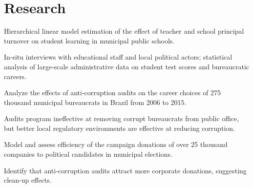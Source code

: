 \documentclass[]{deedy-resume-openfont}
\begin{document}
\begin{minipage}[t]{0.7\textwidth}

\section{Research}
\begin{tightemize}
    \item Hierarchical linear model estimation of the effect of teacher and school principal turnover on student learning in municipal public schools.
    \item In-situ interviews with educational staff and local political actors; statistical analysis of large-scale administrative data on student test scores and bureaucratic careers. 
\end{tightemize}
\sectionsep

\begin{tightemize}
    \item Analyze the effects of anti-corruption audits on the career choices of 275 thousand municipal bureaucrats in Brazil from 2006 to 2015.
    \item Audits program ineffective at removing corrupt bureaucrats from public office, but better local regulatory environments are effective at reducing corruption.
\end{tightemize}
\sectionsep

\begin{tightemize}
    \item Model and assess efficiency of the campaign donations of over 25 thousand companies to political candidates in municipal elections.
    \item Identify that anti-corruption audits attract more corporate donations, suggesting clean-up effects.
\end{tightemize}

\end{minipage} 
\end{document}
